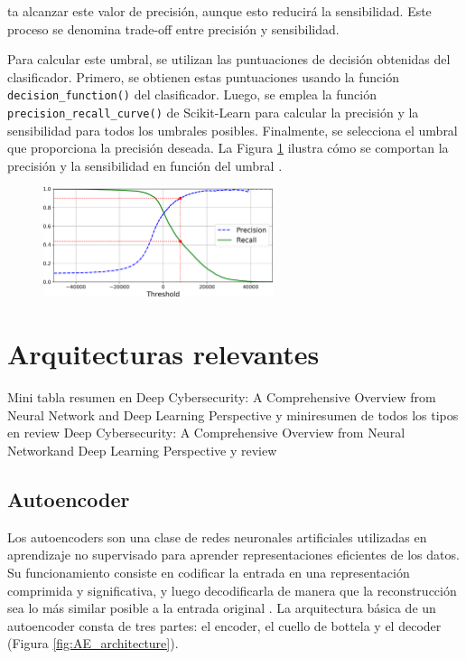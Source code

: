 ta alcanzar este valor de precisión, aunque esto reducirá la sensibilidad. Este proceso se denomina trade-off entre precisión y sensibilidad.

Para calcular este umbral, se utilizan las puntuaciones de decisión obtenidas del clasificador. Primero, se obtienen estas puntuaciones usando la función \lstinline|decision_function()| del clasificador. Luego, se emplea la función \lstinline|precision_recall_curve()| de Scikit-Learn para calcular la precisión y la sensibilidad para todos los umbrales posibles. Finalmente, se selecciona el umbral que proporciona la precisión deseada. La Figura \ref{img: pr_vs_threshold} ilustra cómo se comportan la precisión y la sensibilidad en función del umbral \citep{geron2022hands}.

\begin{figure}[h]
	\centering
    \includegraphics[width=0.6\textwidth]{img/precision_recall_vs_threshold.png}
    \label{img: pr_vs_threshold}
\end{figure}











\section{Arquitecturas relevantes} \label{Subsec: 3_2}
Mini tabla resumen en Deep Cybersecurity: A Comprehensive Overview from Neural Network and Deep Learning Perspective y miniresumen de todos los tipos en review Deep Cybersecurity: A Comprehensive Overview from Neural Networkand Deep Learning Perspective y review

\subsection{Autoencoder}

Los autoencoders son una clase de redes neuronales artificiales utilizadas en aprendizaje no supervisado para aprender representaciones eficientes de los datos. Su funcionamiento consiste en codificar la entrada en una representación comprimida y significativa, y luego decodificarla de manera que la reconstrucción sea lo más similar posible a la entrada original \citep{lopes2022effective}. La arquitectura básica de un autoencoder consta de tres partes: el encoder, el cuello de bottela y el decoder (Figura \ref{fig:AE_architecture}). 



